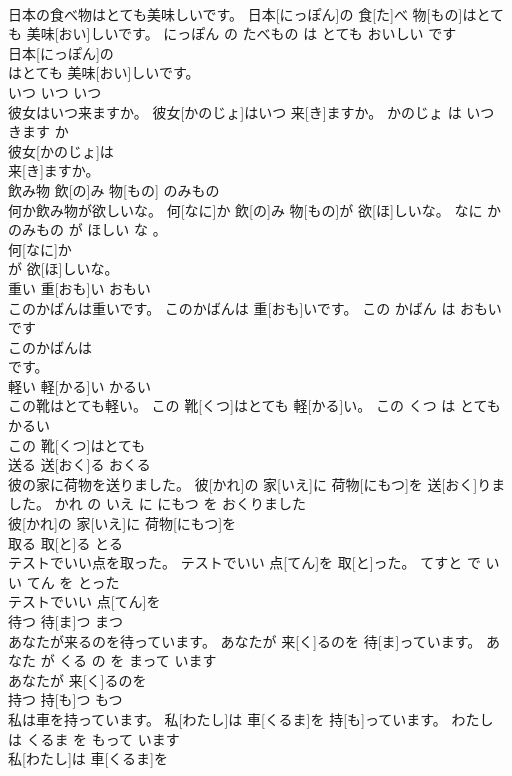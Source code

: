 \documentclass[8pt]{extreport}
\begin{document}
\begin{CJK}{UTF8}{min}
\\	日本の食べ物はとても美味しいです。	日本[にっぽん]の 食[た]べ 物[もの]はとても 美味[おい]しいです。	にっぽん の たべもの は とても おいしい です	
\\	日本[にっぽん]の
\\	はとても 美味[おい]しいです。		
\\	いつ	いつ	いつ	
\\	彼女はいつ来ますか。	彼女[かのじょ]はいつ 来[き]ますか。	かのじょ は いつ きます か	
\\	彼女[かのじょ]は
\\	来[き]ますか。		
\\	飲み物	飲[の]み 物[もの]	のみもの	
\\	何か飲み物が欲しいな。	何[なに]か 飲[の]み 物[もの]が 欲[ほ]しいな。	なに か のみもの が ほしい な 。	
\\	何[なに]か
\\	が 欲[ほ]しいな。		
\\	重い	重[おも]い	おもい	
\\	このかばんは重いです。	このかばんは 重[おも]いです。	この かばん は おもい です	
\\	このかばんは
\\	です。		
\\	軽い	軽[かる]い	かるい	
\\	この靴はとても軽い。	この 靴[くつ]はとても 軽[かる]い。	この くつ は とても かるい	
\\	この 靴[くつ]はとても
\\	送る	送[おく]る	おくる	
\\	彼の家に荷物を送りました。	彼[かれ]の 家[いえ]に 荷物[にもつ]を 送[おく]りました。	かれ の いえ に にもつ を おくりました	
\\	彼[かれ]の 家[いえ]に 荷物[にもつ]を
\\	取る	取[と]る	とる	
\\	テストでいい点を取った。	テストでいい 点[てん]を 取[と]った。	てすと で いい てん を とった	
\\	テストでいい 点[てん]を
\\	待つ	待[ま]つ	まつ	
\\	あなたが来るのを待っています。	あなたが 来[く]るのを 待[ま]っています。	あなた が くる の を まって います	
\\	あなたが 来[く]るのを
\\	持つ	持[も]つ	もつ	
\\	私は車を持っています。	私[わたし]は 車[くるま]を 持[も]っています。	わたし は くるま を もって います	
\\	私[わたし]は 車[くるま]を

\end{CJK}
\end{document}
